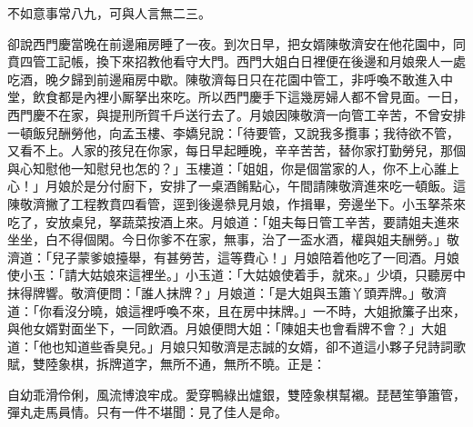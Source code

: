 不如意事常八九，可與人言無二三。

卻說西門慶當晚在前邊廂房睡了一夜。到次日早，把女婿陳敬濟安在他花園中，同賁四管工記帳，換下來招教他看守大門。西門大姐白日裡便在後邊和月娘衆人一處吃酒，晚夕歸到前邊廂房中歇。陳敬濟每日只在花園中管工，非呼喚不敢進入中堂，飲食都是內裡小厮拏出來吃。所以西門慶手下這幾房婦人都不曾見面。一日，西門慶不在家，與提刑所賀千戶送行去了。月娘因陳敬濟一向管工辛苦，不曾安排一頓飯兒酬勞他，向孟玉樓、李嬌兒說：「待要管，又說我多攬事；我待欲不管，又看不上。{}人家的孩兒在你家，每日早起睡晚，辛辛苦苦，替你家打勤勞兒，那個與心知慰他一知慰兒也怎的？」玉樓道：「姐姐，你是個當家的人，你不上心誰上心！」月娘於是分付廚下，安排了一桌酒餚點心，午間請陳敬濟進來吃一頓飯。這陳敬濟撇了工程教賁四看管，逕到後邊叅見月娘，作揖畢，旁邊坐下。小玉拏茶來吃了，安放桌兒，拏蔬菜按酒上來。月娘道：「姐夫每日管工辛苦，要請姐夫進來坐坐，白不得個閑。今日你爹不在家，無事，治了一盃水酒，權與姐夫酬勞。」敬濟道：「兒子蒙爹娘擡舉，有甚勞苦，這等費心！」月娘陪着他吃了一囘酒。月娘使小玉：「請大姑娘來這裡坐。」小玉道：「大姑娘使着手，就來。」少頃，只聽房中抹得牌響。敬濟便問：「誰人抹牌？」月娘道：「是大姐與玉簫丫頭弄牌。」敬濟道：「你看沒分曉，娘這裡呼喚不來，且在房中抹牌。」一不時，大姐掀簾子出來，與他女婿對面坐下，一同飲酒。月娘便問大姐：「陳姐夫也會看牌不會？」大姐道：「他也知道些香臭兒。」{}月娘只知敬濟是志誠的女婿，卻不道這小夥子兒詩詞歌賦，{}雙陸象棋，拆牌道字，無所不通，無所不曉。正是：

自幼乖滑伶俐，風流博浪牢成。愛穿鴨綠出爐銀，雙陸象棋幫襯。琵琶笙箏簫管，彈丸走馬員情。只有一件不堪聞：見了佳人是命。

